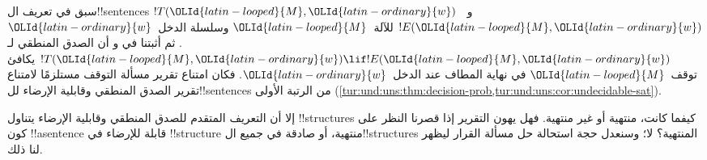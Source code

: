 \documentclass[../../../include/open-logic-section]{subfiles}
\begin{document}

\begin{explain}
  سبق في  تعريف ال!!{sentence}s $!T({\OLId{latin-looped}{M}},{\OLId{latin-ordinary}{w}})$
  و~$!E({\OLId{latin-looped}{M}},{\OLId{latin-ordinary}{w}})$ للآلة~${\OLId{latin-looped}{M}}$ وسلسلة الدخل~${\OLId{latin-ordinary}{w}}$. ثم أثبتنا في
   و
  أن الصدق المنطقي لـ$!T({\OLId{latin-looped}{M}},{\OLId{latin-ordinary}{w}})\lif !E({\OLId{latin-looped}{M}},{\OLId{latin-ordinary}{w}})$ يكافئ توقف~${\OLId{latin-looped}{M}}$
  في نهاية المطاف عند الدخل~${\OLId{latin-ordinary}{w}}$. فكان امتناع تقرير مسألة
  التوقف مستلزمًا لامتناع تقرير الصدق المنطقي وقابلية الإرضاء
  لل!!{sentence}s من الرتبة الأولى
  (\cref{tur:und:uns:thm:decision-prob,tur:und:uns:cor:undecidable-sat}).

  إلا أن التعريف المتقدم للصدق المنطقي وقابلية الإرضاء يتناول
  !!{structure}s كيفما كانت، منتهية أو غير منتهية. فهل يهون
  التقرير إذا قصرنا النظر على كون !!a{sentence} قابلة للإرضاء
  في !!{structure} منتهية، أو صادقة في جميع
  ال!!{structure}s المنتهية؟ لا؛ وسنعدل حجة استحالة حل مسألة
  القرار ليظهر لنا ذلك.


\end{explain}
\end{document}
